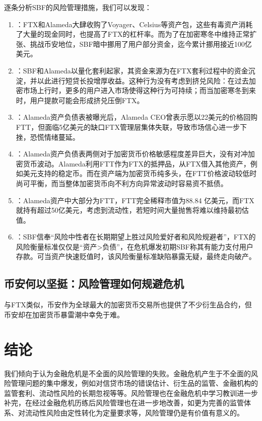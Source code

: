 逐条分析SBF的风险管理措施，我们可以发现：
\begin{enumerate}
    \item \textbf{}：FTX和Alameda大肆收购了Voyager、Celsius等资产包，这些有毒资产消耗了大量的现金同时，也提高了FTX的杠杆率。而为了在加密寒冬中维持正常扩张、挑战币安地位，SBF暗中挪用了用户部分资金，迄今累计挪用接近100亿美元。
    \item \textbf{}：SBF和Alameda以量化套利起家，其资金来源为在FTX套利过程中的资金沉淀，并以此进行短贷长投增厚收益。这种行为没有考虑到挤兑风险：在过去加密市场上行时，更多的用户进入市场使得这种行为可持续；而当加密寒冬到来时，用户提款可能会形成挤兑压倒FTX。
    \item \textbf{}：Alameda资产负债表被曝光后，Alameda CEO曾表示愿以22美元的价格回购FTT，但面临5亿美元的缺口FTX管理层集体失联，导致市场信心进一步下挫，恐慌情绪蔓延。
    \item \textbf{}：Alameda资产负债表两侧对于加密货币价格敏感程度差异巨大，没有对冲加密货币波动。Alameda利用FTT作为FTX的抵押品，从FTX借入其他资产，例如美元支持的稳定币。而在资产端为加密货币纯多头，在FTT价格波动较低时尚可平衡，而当整体加密货币向不利方向异常波动时容易资不抵债。
    \item \textbf{}：Alameda资产中大部分为FTT，FTT完全稀释市值为88.84 亿美元，而FTX就持有超过50亿美元，考虑到流动性，若短时间大量抛售将难以维持最初估值。
    \item \textbf{}：SBF信奉“风险中性者在长期期望上胜过风险爱好者和风险规避者”，FTX的风险衡量标准仅仅是“资产>负债”，在危机爆发初期SBF称其有能力支付用户存款。可当资产快速贬值时，该风险衡量标准缺陷暴露无疑，最终走向破产。
\end{enumerate}

\subsection{币安何以坚挺：风险管理如何规避危机}
与FTX类似，币安作为全球最大的加密货币交易所也提供了不少衍生品合约，但币安却在加密货币暴雷潮中幸免于难。

\section{结论}

我们倾向于认为金融危机是不全面的风险管理的失败。金融危机产生于不全面的风险管理问题的集中爆发，例如对信贷市场的错误估计、衍生品的监管、金融机构的监管套利、流动性风险的长期忽视等等。风险管理也在金融危机中学习教训进一步补完，在经过金融危机历练后风险管理也在进一步地改善，如更为完善的监管体系、对流动性风险由定性转化为定量要求等，风险管理仍是有价值有意义的。
